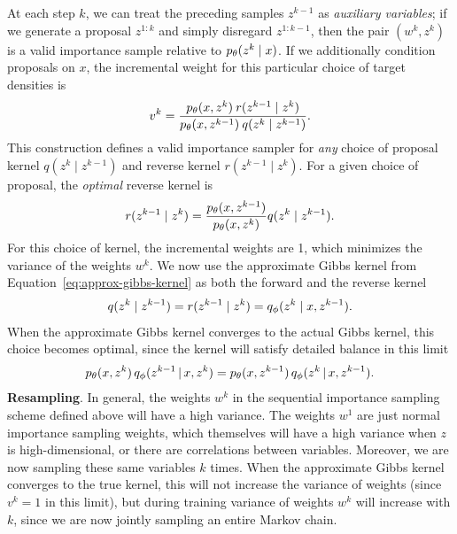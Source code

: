 \documentclass[anonymous=false, %
               format=acmsmall, %
               review=true, %
               screen=true, %
               nonacm=true]{acmart}
\theoremstyle{definition}
\begin{document}
At each step $k$, we can treat the preceding samples $z^{k-1}$ as \emph{auxiliary variables}; if we generate a proposal $z^{1:k}$ and simply disregard $z^{1:k-1}$, then the pair $(w^k, z^k)$ is a valid importance sample relative to $p_\theta(z^k \mid x)$. If we additionally condition proposals on $x$, the incremental weight for this particular choice of target densities is
\begin{align}
    \label{eq:incremental-weight-forward-reverse}
    v^k 
    = 
    \frac{p_\theta(x,z^k) \: r(z^{k-1} \mid  z^k)}
         {p_\theta(x,z^{k-1}) \: q(z^{k} \mid  z^{k-1})}
    .
\end{align}
This construction defines a valid importance sampler for \emph{any} choice of proposal kernel $q(z^k \mid z^{k-1})$ and reverse kernel $r(z^{k-1} \mid z^{k})$. For a given choice of proposal, the \emph{optimal} reverse kernel is
\begin{align*}
    r(z^{k-1} \mid  z^k)
    =   
    \frac{p_\theta(x,z^{k-1})}
         {p_\theta(x,z^k)}
    q(z^{k} \mid  z^{k-1})
    .
\end{align*}
For this choice of kernel, the incremental weights are 1, which minimizes the variance of the weights $w^k$.
We now use the approximate Gibbs kernel from Equation~\ref{eq:approx-gibbs-kernel} as both the forward and the reverse kernel
\begin{align}
    q(z^{k} \mid  z^{k-1}) = r(z^{k-1} \mid  z^k) = q_\phi(z^k \mid x, z^{k-1}).
\end{align}
When the approximate Gibbs kernel converges to the actual Gibbs kernel, this choice becomes optimal, since the kernel will satisfy detailed balance in this limit
\begin{align*}
    p_\theta(x, z^k) 
    \,
    q_\phi(z^{k-1} \,|\, x, z^{k})
    =
    p_\theta(x, z^{k-1}) 
    \,
    q_\phi(z^{k} \,|\, x, z^{k-1}).
\end{align*}
\textbf{Resampling}. In general, the weights $w^k$ in the sequential importance sampling scheme defined above will have a high variance. The weights $w^1$ are just normal importance sampling weights, which themselves will have a high variance when $z$ is high-dimensional, or there are correlations between variables. Moreover, we are now sampling these same variables $k$ times. When the approximate Gibbs kernel converges to the true kernel, this will not increase the variance of weights (since $v^k=1$ in this limit), but during training variance of weights $w^k$ will increase with $k$, since we are now jointly sampling an entire Markov chain.
\end{document}

